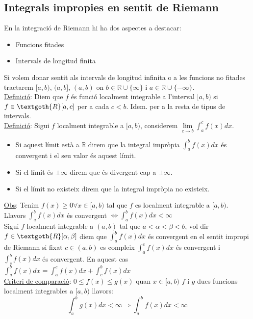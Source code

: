 \documentclass[../main.tex]{subfiles}
\begin{document}
    \subsection{Integrals impropies en sentit de Riemann}
    En la integració de Riemann hi ha dos aspectes a destacar:
    \begin{itemize}
        \item Funcions fitades
        \item Intervals de longitud finita
    \end{itemize}
    Si volem donar sentit als intervals de longitud infinita o a les funcions no fitades tractarem $[a, b)$, $(a, b]$, $(a, b)$ on $b \in \mathbb{R}\cup \{\infty\}$ i $a \in \mathbb{R}\cup \{-\infty\}$.\\
    \underline{Definició}: Diem que $f$ és funció localment integrable a l'interval $[a, b)$ si $f\in \textgoth{R}[a, c]$ per a cada $c < b$. Idem. per a la resta de tipus de intervals.\\
    \underline{Definició}: Sigui $f$ localment integrable a $[a, b)$, considerem $\lim\limits_{c\rightarrow b} \int_a^cf(x)dx$.
    \begin{itemize}
        \item Si aquest límit està a $\mathbb{R}$ direm que la integral impròpia $\int_a^bf(x)dx$ és convergent i el seu valor és aquest límit.
        \item Si el límit és $\pm \infty$ direm que és divergent cap a $\pm \infty$.
        \item Si el límit no existeix direm que la integral impròpia no existeix.
    \end{itemize}
    \underline{Obs}: Tenim $f(x) \geq 0 \forall x \in [a, b)$  tal que $f$ es localment integrable a $[a, b)$. Llavors $\int_a^b f(x) dx$ és convergent $\Leftrightarrow \int_a^b f(x) dx < \infty$\\
    Sigui $f$ localment integrable a $(a, b)$ tal que $a < \alpha < \beta < b$, vol dir $f \in \textgoth{R}[\alpha, \beta]$ diem que $\int_a^b f(x)dx$ és convergent en el sentit impropi de Riemann si fixat $c \in (a, b)$ es compleix $\int_a^c f(x)dx$ és convergent i $\int_c^b f(x)dx$ és convergent. En aquest cas $\int_a^b f(x)dx = \int_a^c f(x)dx + \int_c^b f(x)dx$\\
    \underline{Criteri de comparació}: $0 \leq f(x) \leq g(x)$ quan $x \in [a, b)$ $f$ i $g$ dues funcions localment integrables a $[a, b)$ llavors:
    \begin{displaymath}
        \int_a^b g(x)dx < \infty \Rightarrow \int_a^b f(x) dx < \infty
    \end{displaymath}
\end{document}
